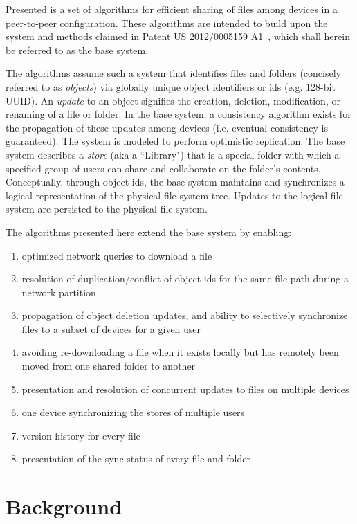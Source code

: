 Presented is a set of algorithms for efficient sharing of files among devices
in a peer-to-peer configuration. These algorithms are intended to build upon the
system and methods claimed in Patent US 2012/0005159 A1~\cite{wang:patent2012},
which shall herein be referred to as the base system.

The algorithms assume such a system that identifies files and folders
(concisely referred to as {\em objects}) via globally unique object identifiers
or ids (e.g. 128-bit UUID). An {\em update} to an object signifies the
creation, deletion, modification, or renaming of a file or folder. In the base
system, a consistency algorithm exists for the propagation of these updates
among devices (i.e. eventual consistency is guaranteed). The system is modeled
to perform optimistic replication. The base system describes a {\em store} (aka
a ``Library") that is a special folder with which a specified group of users can
share and collaborate on the folder's contents. Conceptually, through object
ids, the base system maintains and synchronizes a logical representation of the
physical file system tree. Updates to the logical file system are persisted to
the physical file system.

The algorithms presented here extend the base system by enabling:
\begin{enumerate}
\item optimized network queries to download a file
\item resolution of duplication/conflict of object ids for the same file path
during a network partition
\item propagation of object deletion updates, and ability to selectively
synchronize files to a subset of devices for a given user
\item avoiding re-downloading a file when it exists locally but has remotely been
moved from one shared folder to another
\item presentation and resolution of concurrent updates to files on multiple
devices
\item one device synchronizing the stores of multiple users
\item version history for every file
\item presentation of the sync status of every file and folder
\end{enumerate}

\section*{Background}


